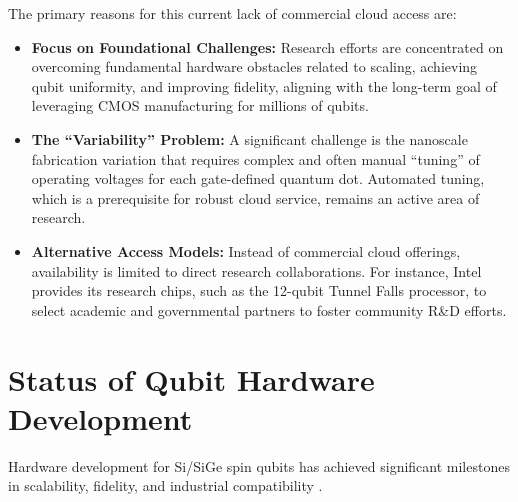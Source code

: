 The primary reasons for this current lack of commercial cloud access are:
\begin{itemize}
    \item \textbf{Focus on Foundational Challenges:} Research efforts are concentrated on overcoming fundamental hardware obstacles related to scaling, achieving qubit uniformity, and improving fidelity, aligning with the long-term goal of leveraging CMOS manufacturing for millions of qubits.
    \item \textbf{The ``Variability'' Problem:} A significant challenge is the nanoscale fabrication variation that requires complex and often manual ``tuning'' of operating voltages for each gate-defined quantum dot. Automated tuning, which is a prerequisite for robust cloud service, remains an active area of research.
    \item \textbf{Alternative Access Models:} Instead of commercial cloud offerings, availability is limited to direct research collaborations. For instance, Intel provides its research chips, such as the 12-qubit Tunnel Falls processor, to select academic and governmental partners to foster community R\&D efforts.
\end{itemize}

\section{Status of Qubit Hardware Development}

Hardware development for Si/SiGe spin qubits has achieved significant milestones in scalability, fidelity, and industrial compatibility \cite{ref1, ref4, ref9, ref10, ref11}.

